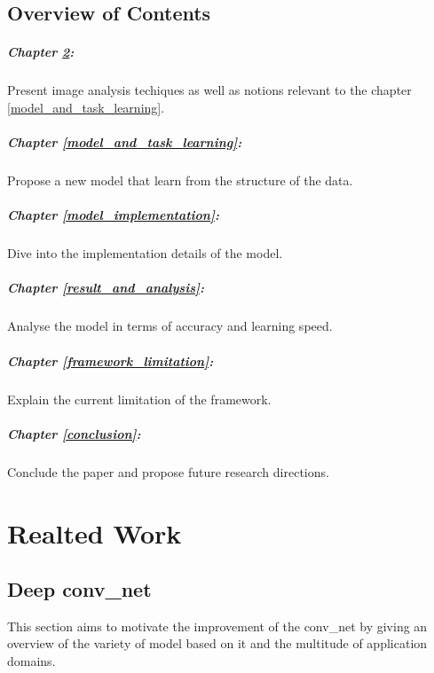 \documentclass[11pt]{report}
\begin{document}
\section{Overview of Contents}

\paragraph{Chapter \ref{related_work}:} Present image analysis techiques as well as notions relevant to the chapter \ref{model_and_task_learning}.
\paragraph{Chapter \ref{model_and_task_learning}:} Propose a new model that learn from the structure of the data.
\paragraph{Chapter \ref{model_implementation}:} Dive into the implementation details of the model.
\paragraph{Chapter \ref{result_and_analysis}:} Analyse the model in terms of accuracy and learning speed.
\paragraph{Chapter \ref{framework_limitation}:} Explain the current limitation of the framework.
\paragraph{Chapter \ref{conclusion}:} Conclude the paper and propose future research directions.

\chapter{Realted Work} \label{related_work}


\section{Deep \acrshort{conv_net}}

This section aims to motivate the improvement of the \acrshort{conv_net} by giving an overview of the variety of model based on it and the multitude of application domains.
\end{document}
